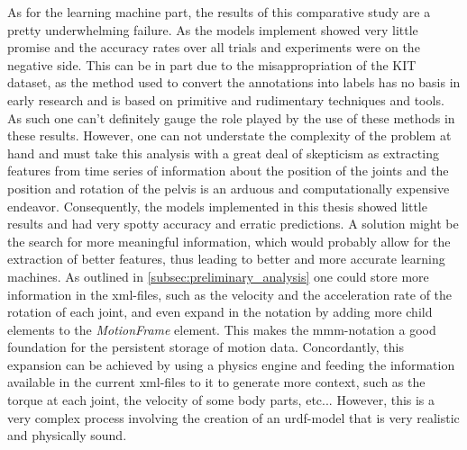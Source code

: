 As for the learning machine part, the results of this comparative study are a pretty underwhelming failure. As the models implement showed very little promise and the accuracy rates over all trials and experiments were on the negative side. This can be in part due to the misappropriation of the KIT dataset, as the method used to convert the annotations into labels has no basis in early research and is based on primitive and rudimentary techniques and tools. As such one can't definitely gauge the role played by the use of these methods in these results. However, one can not understate the complexity of the problem at hand and must take this analysis with a great deal of skepticism as extracting features from time series of information about the position of the joints and the position and rotation of the pelvis is an arduous and computationally expensive endeavor. Consequently, the models implemented in this thesis showed little results and had very spotty accuracy and erratic predictions.\newline
A solution might be the search for more meaningful information, which would probably allow for the extraction of better features, thus leading to better and more accurate learning machines. As outlined in \ref{subsec:preliminary_analysis} one could store more information in the xml-files, such as the velocity and the acceleration rate of the rotation of each joint, and even expand in the notation by adding more child elements to the \textit{MotionFrame} element. This makes the mmm-notation a good foundation for the persistent storage of motion data. Concordantly, this expansion can be achieved by using a physics engine and feeding the information available in the current xml-files to it to generate more context, such as the torque at each joint, the velocity of some body parts, etc... However, this is a very complex process involving the creation of an urdf-model that is very realistic and physically sound.\newline
